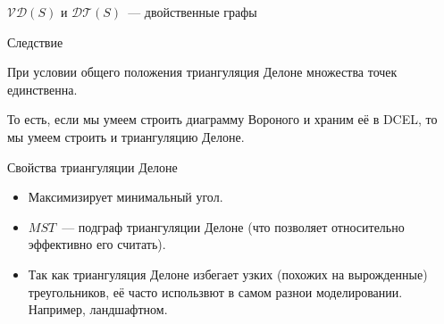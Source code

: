 \documentclass[12pt,aspectratio=169,svgnames]{beamer}
\begin{document}
    \begin{frame}{$\mathcal{V}\mathcal{D}(S)$ и $\mathcal{D}\mathcal{T}(S)$~--- двойственные графы}

        \begin{block}{Следствие}

                При условии общего положения триангуляция Делоне множества точек единственна.

        \end{block}

        То есть, если мы умеем строить диаграмму Вороного и храним её в DCEL, то мы умеем строить и триангуляцию
        Делоне.

    \end{frame}

    \begin{frame}{Свойства триангуляции Делоне}

        \begin{itemize}

            \item Максимизирует минимальный угол.

            \item $MST$~--- подграф триангуляции Делоне (что позволяет относительно эффективно его считать).

            \item Так как триангуляция Делоне избегает узких (похожих на вырожденные) треугольников, её часто использвют
                  в самом разнои моделировании. Например, ландшафтном.

        \end{itemize}

    \end{frame}
\end{document}
